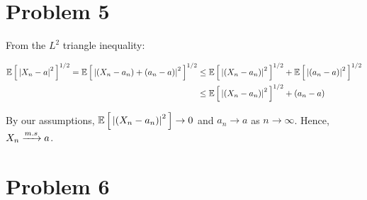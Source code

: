 \documentclass[12pt]{article}%
\begin{document}
\section{Problem 5}
From the $L^2$ triangle inequality:

\begin{align*}
\mathbb{E}\left[\,\abs{X_n - a}^2\,\right]^{1/2} = \mathbb{E}\left[\,\abs{(X_n - a_n) + (a_n - a)}^2\,\right]^{1/2} & \leq \mathbb{E}\left[\,\abs{(X_n - a_n)}^2\,\right]^{1/2} + \mathbb{E}\left[\,\abs{(a_n - a)}^2\,\right]^{1/2} \\
& \leq \mathbb{E}\left[\,\abs{(X_n - a_n)}^2\,\right]^{1/2} + (a_n - a)
\end{align*}

By our assumptions, $\mathbb{E}\left[\,\abs{(X_n - a_n)}^2\,\right] \rightarrow 0$ and $a_n \rightarrow a$ as $n \rightarrow \infty$. Hence, $X_n \xrightarrow[]{m.s} a$.

\section{Problem 6}
\end{document}
